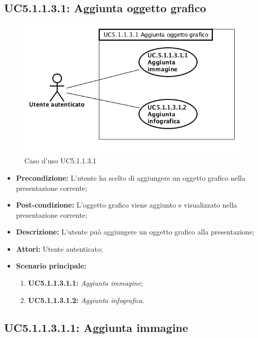 \newpage
\subsection{ UC5.1.1.3.1: Aggiunta oggetto grafico}

\begin{figure}[h]
	\begin{center}
	\includegraphics[scale=0.4]{diagram/UC5-1-1-3-1.png}
	\caption{Caso d'uso UC5.1.1.3.1}
	\end{center}
\end{figure}
\begin{itemize}
	\item \textbf{Precondizione:} L'utente ha scelto di aggiungere un oggetto grafico nella presentazione corrente;
	\item \textbf{Post-condizione:} L'oggetto grafico viene aggiunto e visualizzato nella presentazione corrente;
	\item \textbf{Descrizione:} L'utente può aggiungere un oggetto grafico alla presentazione;
	\item \textbf{Attori:} Utente autenticato;
	\item \textbf{Scenario principale:}
	\begin{enumerate}
		\item \textbf{ UC5.1.1.3.1.1:} \textit{ Aggiunta immagine};
		\item \textbf{ UC5.1.1.3.1.2:} \textit{ Aggiunta infografica}.
	\end{enumerate}
\end{itemize}

\newpage
\subsection{ UC5.1.1.3.1.1: Aggiunta immagine}

